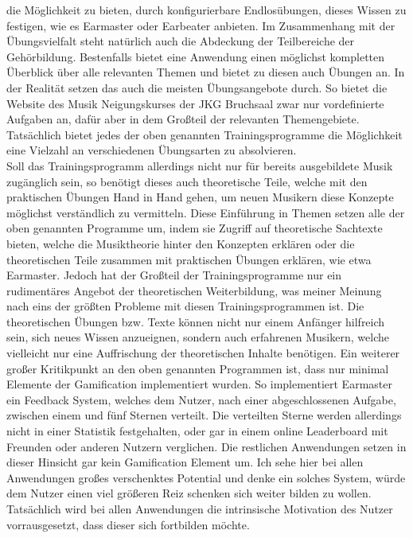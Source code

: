 die Möglichkeit zu bieten, durch konfigurierbare Endlosübungen, dieses Wissen zu festigen, wie es Earmaster  oder Earbeater anbieten. Im Zusammenhang mit der Übungsvielfalt steht natürlich auch die Abdeckung der Teilbereiche der Gehörbildung. Bestenfalls bietet eine Anwendung einen möglichst kompletten Überblick 
über alle relevanten Themen und bietet zu diesen auch Übungen an. In der Realität setzen das auch die meisten Übungsangebote durch. So bietet die Website des Musik Neigungskurses der JKG Bruchsaal zwar nur vordefinierte Aufgaben an, dafür aber in dem Großteil der relevanten Themengebiete. Tatsächlich bietet jedes der oben genannten Trainingsprogramme
die Möglichkeit eine Vielzahl an verschiedenen Übungsarten zu absolvieren.  \\
Soll das Trainingsprogramm allerdings nicht nur für bereits ausgebildete Musik zugänglich sein, so benötigt dieses auch theoretische Teile, welche mit den praktischen Übungen Hand in Hand gehen, um neuen Musikern diese Konzepte möglichst verständlich zu vermitteln. Diese Einführung in Themen setzen alle der oben genannten Programme um, indem sie Zugriff auf theoretische Sachtexte bieten, welche
die Musiktheorie hinter den Konzepten erklären oder die theoretischen Teile zusammen mit praktischen Übungen erklären, wie etwa Earmaster. Jedoch hat der Großteil der Trainingsprogramme nur ein rudimentäres Angebot der theoretischen Weiterbildung, was meiner Meinung nach eins der größten Probleme mit diesen Trainingsprogrammen ist. Die theoretischen 
Übungen bzw. Texte können nicht nur einem Anfänger hilfreich sein, sich neues Wissen anzueignen, sondern auch erfahrenen Musikern, welche vielleicht nur eine Auffrischung der theoretischen Inhalte benötigen. Ein weiterer großer Kritikpunkt an den oben genannten Programmen ist, dass nur minimal Elemente der Gamification implementiert wurden. So implementiert Earmaster ein Feedback System, 
welches dem Nutzer, nach einer abgeschlossenen Aufgabe, zwischen einem und fünf Sternen verteilt. Die verteilten Sterne werden allerdings nicht in einer Statistik festgehalten, oder gar in einem online Leaderboard mit Freunden oder anderen Nutzern verglichen. Die restlichen Anwendungen setzen in dieser Hinsicht gar kein Gamification Element um. Ich sehe hier bei allen Anwendungen großes verschenktes Potential und denke 
ein solches System, würde dem Nutzer einen viel größeren Reiz schenken sich weiter bilden zu wollen. Tatsächlich wird bei allen Anwendungen die intrinsische Motivation des Nutzer vorrausgesetzt, dass dieser sich fortbilden möchte. \\ 
